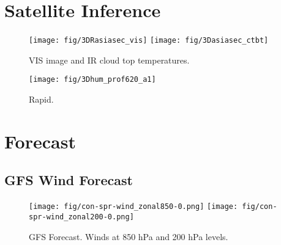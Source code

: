 \documentclass[12pt,a4paper]{article} %
\begin{document}



\section{Satellite Inference}
\begin{figure}[H]
\centering
\texttt{[image: fig/3DRasiasec\_vis]}
\texttt{[image: fig/3Dasiasec\_ctbt]}
\caption{VIS image and IR cloud top temperatures.}
\end{figure}


\begin{figure}[H]
\centering
\texttt{[image: fig/3Dhum\_prof620\_a1]}

\caption{ Rapid.}
\end{figure}




\section{Forecast}



\subsection*{GFS Wind Forecast}

\begin{figure}[H]
\centering
\texttt{[image: fig/con-spr-wind\_zonal850-0.png]}
\texttt{[image: fig/con-spr-wind\_zonal200-0.png]}
\caption{GFS Forecast. Winds at 850 hPa and 200 hPa levels.}
\end{figure}
\end{document}
